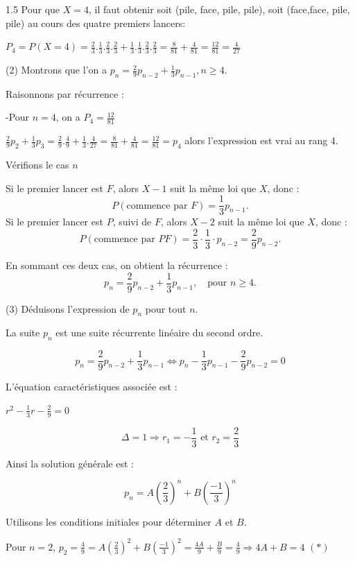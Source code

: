 \documentclass[12pt]{article}
\begin{document}
\begin{spacing}{1.5}
 Pour que $X=4$, il faut obtenir soit (pile, face, pile, pile), soit (face,face, pile, pile) au cours des quatre premiers lancers:
 
 $P_4=P(X=4)=\frac{2}{3}.\frac{1}{3}.\frac{2}{3}.\frac{2}{3}+\frac{1}{3}.\frac{1}{3}.\frac{2}{3}.\frac{2}{3}=\frac{8}{81}+\frac{4}{81}=\frac{12}{81}=\frac{4}{27}$
 


(2) Montrons que l'on a $p_n = \frac{2}{9}p_{n-2}+\frac{1}{3}p_{n-1}, n\geq 4.$

Raisonnons par récurrence :

-Pour $n=4$, on a $P_4=\frac{12}{81}$

$\frac{2}{9}p_{2}+\frac{1}{3}p_{3}=\frac{2}{9}.\frac{4}{9}+\frac{1}{3}.\frac{4}{27}=\frac{8}{81}+\frac{4}{81}=\frac{12}{81}=p_4$ alors l'expression est vrai au rang 4. 

Vérifions le cas $n$

 Si le premier lancer est \( F \), alors \( X - 1 \) suit la même loi que \( X \), donc :
   \[
   P(\text{commence par } F) = \frac{1}{3} p_{n-1}.
   \]
 Si le premier lancer est \( P \), suivi de \( F \), alors \( X - 2 \) suit la même loi que \( X \), donc :
   \[
   P(\text{commence par } PF) = \frac{2}{3} \cdot \frac{1}{3} \cdot p_{n-2} = \frac{2}{9} p_{n-2}.
   \]

En sommant ces deux cas, on obtient la récurrence :
\[
p_n = \frac{2}{9} p_{n-2} + \frac{1}{3} p_{n-1}, \quad \text{pour } n \geq 4.
\]

 
 (3) Déduisons l'expression de $p_n$ pour tout $n$.
 
 La suite $p_n$ est une suite récurrente linéaire du second ordre. 
 
 \[p_n = \frac{2}{9}p_{n-2}+\frac{1}{3}p_{n-1}\Leftrightarrow  p_n -\frac{1}{3}p_{n-1}-\frac{2}{9}p_{n-2}=0\]
 
 L'équation caractéristiques associée est :
 
 $r^2-\frac{1}{3}r-\frac{2}{9}=0$ 
 
 \[\Delta=1\Rightarrow r_1=-\frac{1}{3} \text{ et } r_2=\frac{2}{3}\]

Ainsi la solution générale est :

\[p_n=A\left(\frac{2}{3}\right)^n+B\left(\frac{-1}{3}\right)^n\]

Utilisons les conditions initiales pour déterminer $A$ et $B$.

Pour $n=2$, $p_2=\frac{4}{9}=A\left(\frac{2}{3}\right)^2+B\left(\frac{-1}{3}\right)^2=\frac{4A}{9}+\frac{B}{9}=\frac{4}{9}\Rightarrow 4A+B=4$ $(*)$


\end{spacing}
\end{document}
